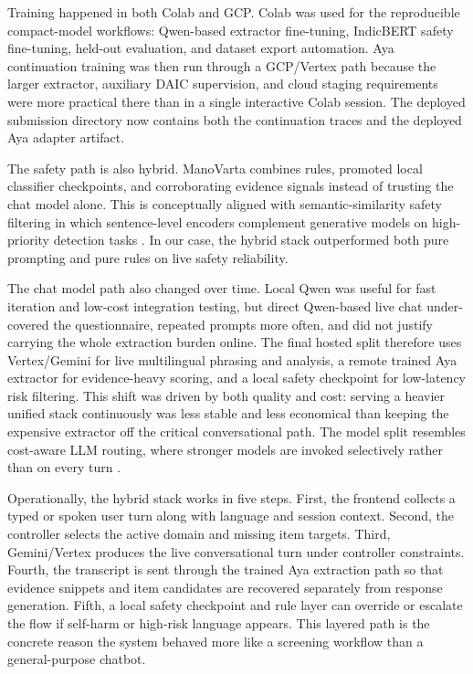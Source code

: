 \documentclass[11pt]{article}
\begin{document}
Training happened in both Colab and GCP. Colab was used for the reproducible compact-model workflows: Qwen-based extractor fine-tuning, IndicBERT safety fine-tuning, held-out evaluation, and dataset export automation. Aya continuation training was then run through a GCP/Vertex path because the larger extractor, auxiliary DAIC supervision, and cloud staging requirements were more practical there than in a single interactive Colab session. The deployed submission directory now contains both the continuation traces and the deployed Aya adapter artifact.

The safety path is also hybrid. ManoVarta combines rules, promoted local classifier checkpoints, and corroborating evidence signals instead of trusting the chat model alone. This is conceptually aligned with semantic-similarity safety filtering in which sentence-level encoders complement generative models on high-priority detection tasks \citep{reimers2019sbert}. In our case, the hybrid stack outperformed both pure prompting and pure rules on live safety reliability.

The chat model path also changed over time. Local Qwen was useful for fast iteration and low-cost integration testing, but direct Qwen-based live chat under-covered the questionnaire, repeated prompts more often, and did not justify carrying the whole extraction burden online. The final hosted split therefore uses Vertex/Gemini for live multilingual phrasing and analysis, a remote trained Aya extractor for evidence-heavy scoring, and a local safety checkpoint for low-latency risk filtering. This shift was driven by both quality and cost: serving a heavier unified stack continuously was less stable and less economical than keeping the expensive extractor off the critical conversational path. The model split resembles cost-aware LLM routing, where stronger models are invoked selectively rather than on every turn \citep{chen2023frugalgpt}.

Operationally, the hybrid stack works in five steps. First, the frontend collects a typed or spoken user turn along with language and session context. Second, the controller selects the active domain and missing item targets. Third, Gemini/Vertex produces the live conversational turn under controller constraints. Fourth, the transcript is sent through the trained Aya extraction path so that evidence snippets and item candidates are recovered separately from response generation. Fifth, a local safety checkpoint and rule layer can override or escalate the flow if self-harm or high-risk language appears. This layered path is the concrete reason the system behaved more like a screening workflow than a general-purpose chatbot.
\end{document}
